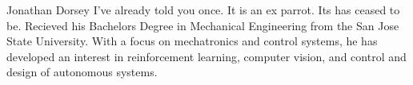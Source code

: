 \documentclass[journal]{IEEEtran}
\begin{document}
\printbibliography

\begin{IEEEbiography}{Jonathan Dorsey}
  I've already told you once. It is an ex parrot. Its has ceased to be. Recieved his Bachelors Degree in Mechanical Engineering from the San Jose State University. With a focus on mechatronics and control systems, he has developed an interest in reinforcement learning, computer vision, and control and design of autonomous systems.
\end{IEEEbiography}
\end{document}
